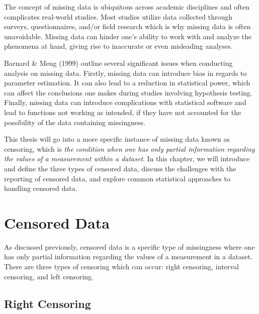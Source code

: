 \documentclass[12pt, twoside]{amherstthesis}
\begin{document}
The concept of missing data is ubiquitous across academic disciplines and often complicates real-world studies. Most studies utilize data collected through surveys, questionnaires, and/or field research which is why missing data is often unavoidable. Missing data can hinder one's ability to work with and analyze the phenomena at hand, giving rise to inaccurate or even misleading analyses.

Barnard \& Meng (1999) outline several significant issues when conducting analysis on missing data. Firstly, missing data can introduce bias in regards to parameter estimation. It can also lead to a reduction in statistical power, which can affect the conclusions one makes during studies involving hypothesis testing. Finally, missing data can introduce complications with statistical software and lead to functions not working as intended, if they have not accounted for the possibility of the data containing missingness.

This thesis will go into a more specific instance of missing data known as censoring, which is \emph{the condition when one has only partial information regarding the values of a measurement within a dataset}. In this chapter, we will introduce and define the three types of censored data, discuss the challenges with the reporting of censored data, and explore common statistical approaches to handling censored data.

\hypertarget{censored_data}{%
\section{Censored Data}\label{censored_data}}

As discussed previously, censored data is a specific type of missingness where one has only partial information regarding the values of a measurement in a dataset. There are three types of censoring which can occur: right censoring, interval censoring, and left censoring.

\hypertarget{right}{%
\subsection{Right Censoring}\label{right}}
\end{document}
